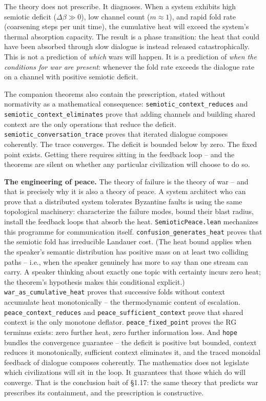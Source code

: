 \documentclass[
  11pt,
]{article}
\begin{document}
The theory does not prescribe. It diagnoses. When a system exhibits high
semiotic deficit (\(\Delta\beta \gg 0\)), low channel count
(\(m \approx 1\)), and rapid fold rate (coarsening steps per unit time),
the cumulative heat will exceed the system's thermal absorption
capacity. The result is a phase transition: the heat that could have
been absorbed through slow dialogue is instead released
catastrophically. This is not a prediction of \emph{which} wars will
happen. It is a prediction of \emph{when the conditions for war are
present}: whenever the fold rate exceeds the dialogue rate on a channel
with positive semiotic deficit.

The companion theorems also contain the prescription, stated without
normativity as a mathematical consequence:
\texttt{semiotic\_context\_reduces} and
\texttt{semiotic\_context\_eliminates} prove that adding channels and
building shared context are the only operations that reduce the deficit.
\texttt{semiotic\_conversation\_trace} proves that iterated dialogue
composes coherently. The trace converges. The deficit is bounded below
by zero. The fixed point exists. Getting there requires sitting in the
feedback loop -- and the theorems are silent on whether any particular
civilization will choose to do so.

\textbf{The engineering of peace.} The theory of failure is the theory
of war -- and that is precisely why it is also a theory of peace. A
system architect who can prove that a distributed system tolerates
Byzantine faults is using the same topological machinery: characterize
the failure modes, bound their blast radius, install the feedback loops
that absorb the heat. \texttt{SemioticPeace.lean} mechanizes this
programme for communication itself. \texttt{confusion\_generates\_heat}
proves that the semiotic fold has irreducible Landauer cost. (The heat
bound applies when the speaker's semantic distribution has positive mass
on at least two colliding paths -- i.e., when the speaker genuinely has
more to say than one stream can carry. A speaker thinking about exactly
one topic with certainty incurs zero heat; the theorem's hypothesis
makes this conditional explicit.) \texttt{war\_as\_cumulative\_heat}
proves that successive folds without context accumulate heat
monotonically -- the thermodynamic content of escalation.
\texttt{peace\_context\_reduces} and \texttt{peace\_sufficient\_context}
prove that shared context is the only monotone deflator.
\texttt{peace\_fixed\_point} proves the RG terminus exists: zero further
heat, zero further information loss. And \texttt{hope} bundles the
convergence guarantee -- the deficit is positive but bounded, context
reduces it monotonically, sufficient context eliminates it, and the
traced monoidal feedback of dialogue composes coherently. The
mathematics does not legislate which civilizations will sit in the loop.
It guarantees that those which do will converge. That is the conclusion
bait of §1.17: the same theory that predicts war prescribes its
containment, and the prescription is constructive.
\end{document}
